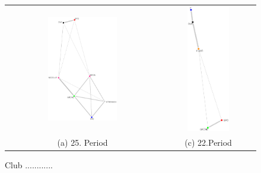 \begin{figure}
\begin{tabular}{ c  c }
	\includegraphics[width=0.47\textwidth]{imgs/graphs/club-graphs/graph_25.eps} 
	& \includegraphics[width=0.47\textwidth]{imgs/graphs/club-graphs/graph_22.eps}
	\\
	(a) 25. Period 
	& (c) 22.Period
\end{tabular}
	\caption{Club ............}
	\label{fig:club_graphs1}
\end{figure}


